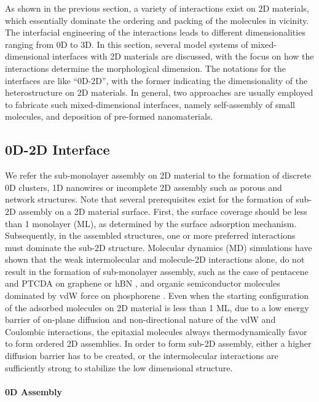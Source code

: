 As shown in the previous section, a variety of interactions exist on 2D
materials, which
essentially dominate the ordering and packing of the molecules in vicinity.
%
The interfacial engineering of the interactions leads to different
dimensionalities ranging from 0D to 3D.
%
In this section, several model systems of mixed-dimensional interfaces
with 2D materials are discussed, with the focus on how the
interactions determine the morphological dimension. The notations for
the interfaces are like ``0D-2D'', with the former indicating the
dimensionality of the heterostructure on 2D materials. In general, two
approaches are usually employed to fabricate such mixed-dimensional
interfaces, namely self-assembly of small molecules, and deposition of
pre-formed nano\-materials. 

\subsection{0D-2D Interface}
\label{sec:org4aa8cd7}


We refer the sub-monolayer assembly on 2D material to the formation of
discrete 0D clusters, 1D nanowires or incomplete 2D assembly such as
porous and network structures. Note that several prerequisites exist
for the formation of sub-2D assembly on a 2D material surface. First,
the surface coverage should be less than 1 monolayer (ML), as
determined by the surface adsorption mechanism. Subsequently, in the
assembled structures, one or more preferred interactions must dominate
the sub-2D structure. Molecular dynamics (MD) simulations have shown
that the weak intermolecular and molecule-2D interactions alone, do
not result in the formation of sub-monolayer assembly, such as the case of
pentacene and PTCDA on graphene or hBN
\cite{Zhao_2015_self_assemb_gr_MD}, and organic semiconductor molecules
dominated by vdW force on phosphorene
\cite{Mukhopadhyay_2017_cryst_BP}. Even when the starting configuration
of the adsorbed molecules on 2D material is less than 1 ML, due to a
low energy barrier of on-plane diffusion and non-directional nature of
the vdW and Coulombic interactions, the epitaxial molecules always
thermodynamically favor to form ordered 2D assemblies. In order to
form sub-2D assembly, either a higher diffusion barrier has to be
created, or the intermolecular interactions are sufficiently strong to
stabilize the low dimensional structure. 

\paragraph{0D Assembly}
\label{sec:org8117691}


